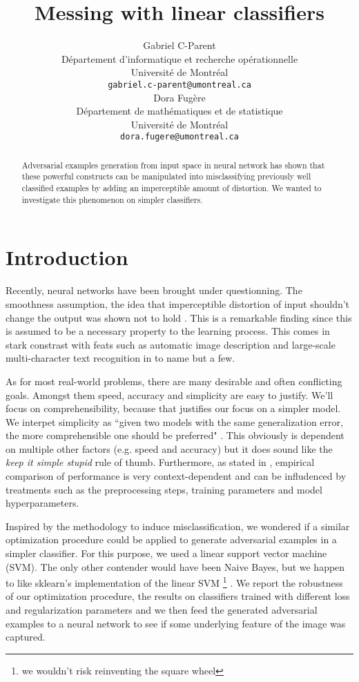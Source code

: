 \documentclass{article} %
\title{Messing with linear classifiers}
\author{
Gabriel C-Parent\\
Département d’informatique et recherche opérationnelle\\
Université de Montréal\\
\texttt{gabriel.c-parent@umontreal.ca} \\
\And
Dora Fugère \\
Département de mathématiques et de statistique \\
Université de Montréal\\
\texttt{dora.fugere@umontreal.ca} \\
}
\begin{document}
\maketitle

\begin{abstract}
Adversarial examples generation from input space in neural network
has shown that these powerful constructs can be manipulated into misclassifying
previously well classified examples by adding an imperceptible amount of
distortion. We wanted to investigate this phenomenon on simpler classifiers.
\end{abstract}


\section{Introduction}

Recently, neural networks have been brought under questionning. The smoothness
assumption, the idea that imperceptible distortion of input shouldn't change
the output was shown not to hold \citep{szegedy_intriguing_2013}. This is a
remarkable finding since this is assumed to be a necessary property to the
learning process.
This comes in stark constrast with feats such as automatic image description
\citep{vinyals_show_2014} and large-scale multi-character text recognition in
\citep{goodfellow_multi-digit_2013} to name but a few.

As for most real-world problems, there are many desirable and often conflicting
goals. Amongst them speed, accuracy and simplicity are easy to justify.
We'll focus on comprehensibility, because that justifies our focus on a simpler
model.
We interpet simplicity as ``given two models with the same generalization error, the more
comprehensible one should be preferred" \citep{domingos_role_1999}.
This obviously is dependent on multiple other factors (e.g. speed and accuracy)
but it does sound like the \textit{keep it simple stupid} rule of thumb.
Furthermore, as stated in \citep{hand_classifier_2006}, empirical comparison of
performance is very context-dependent and can be infludenced by treatments such 
as the preprocessing steps, training parameters and model hyperparameters.

Inspired by the methodology to induce misclassification, we wondered
if a similar optimization procedure could be applied to generate adversarial
examples in a simpler classifier. For this purpose, we used a linear support
vector machine (SVM). The only other contender would have been Naive Bayes,
but we happen to like sklearn's implementation of the linear SVM \footnote{we wouldn't
risk reinventing the square wheel} \citep{pedregosa_scikit-learn:_2011}.
We report the robustness of our optimization procedure, the results on classifiers
trained with different loss and regularization parameters and we then feed the 
generated adversarial examples to a neural network to see if some underlying
feature of the image was captured.
\end{document}
